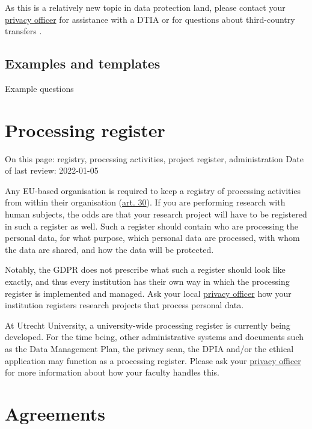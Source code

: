 \documentclass[
]{book}
\begin{document}
As this is a relatively new topic in data protection land, please contact your
\protect\hyperlink{support}{privacy officer}
for assistance with a DTIA or for questions about third-country transfers .

\hypertarget{examples-and-templates-4}{%
\subsection{Examples and templates}\label{examples-and-templates-4}}

Example questions

\hypertarget{processing-register}{%
\section{Processing register}\label{processing-register}}

On this page: registry, processing activities, project register, administration
Date of last review: 2022-01-05

Any EU-based organisation is required to keep a registry of processing
activities from within their organisation
(\href{https://gdpr-info.eu/art-30-gdpr/}{art. 30}).
If you are performing research with human subjects, the odds are that your
research project will have to be registered in such a register as well. Such a
register should contain who are processing the personal data, for what purpose,
which personal data are processed, with whom the data are shared, and how the
data will be protected.

Notably, the GDPR does not prescribe what such a register should look like
exactly, and thus every institution has their own way in which the processing
register is implemented and managed. Ask your local \protect\hyperlink{support}{privacy officer} how your
institution registers research projects that process personal data.

At Utrecht University, a university-wide processing register is currently being
developed. For the time being, other administrative systems and documents such as
the Data Management Plan, the privacy scan, the DPIA and/or the ethical
application may function as a processing register. Please ask your
\protect\hyperlink{support}{privacy officer} for more information about how your faculty handles this.

\hypertarget{agreements}{%
\section{Agreements}\label{agreements}}
\end{document}
